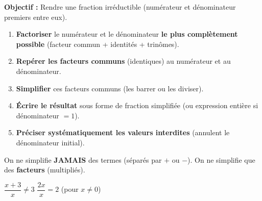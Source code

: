 \documentclass[11pt]{article}
\begin{document}
\begin{methode}
    \textbf{Objectif :} Rendre une fraction irréductible (numérateur et dénominateur premiers entre eux).
    \begin{enumerate}
        \item \textbf{Factoriser} le numérateur et le dénominateur \textbf{le plus complètement possible} (facteur commun + identités + trinômes).
        \item \textbf{Repérer les facteurs communs} (identiques) au numérateur et au dénominateur.
        \item \textbf{Simplifier} ces facteurs communs (les barrer ou les diviser).
        \item \textbf{Écrire le résultat} sous forme de fraction simplifiée (ou expression entière si dénominateur $=1$).
        \item \textbf{Préciser \textbf{systématiquement} les valeurs interdites} (annulent le dénominateur initial).
    \end{enumerate}
    \begin{attention} On ne simplifie \textbf{JAMAIS} des termes (séparés par $+$ ou $-$). On ne simplifie que des \textbf{facteurs} (multipliés).
    \begin{center}
    $\dfrac{x+3}{x} \neq 3$ \quad $\dfrac{2x}{x} = 2$ (pour $x \neq 0$)
    \end{center}
    \end{attention}
\end{methode}
\end{document}
